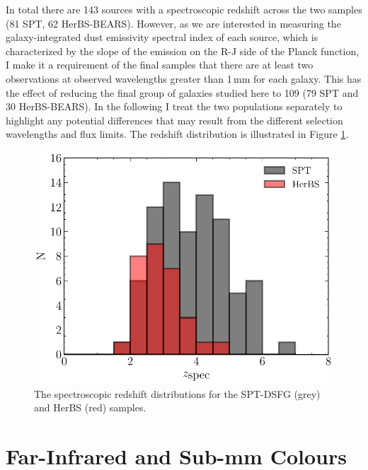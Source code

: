 In total there are 143 sources with a spectroscopic redshift across the two samples (81 SPT, 62 HerBS-BEARS). However, as we are interested in measuring the galaxy-integrated dust emissivity spectral index of each source, which is characterized by the slope of the emission on the R-J side of the Planck function, I make it a requirement of the final samples that there are at least two observations at observed wavelengths greater than 1\,mm for each galaxy. This has the effect of reducing the final group of galaxies studied here to 109 (79 SPT and 30 HerBS-BEARS). In the following I treat the two populations separately to highlight any potential differences that may result from the different selection wavelengths and flux limits. The redshift distribution is illustrated in Figure \ref{fig:spt_herbs_redshift}.

\begin{figure}
	\includegraphics[width=\columnwidth]{Figures/spt_herbs_redshift_distribution.pdf}
	\caption{The spectroscopic redshift distributions for the SPT-DSFG (grey) and HerBS (red) samples.}
	\label{fig:spt_herbs_redshift}
\end{figure}

\section{Far-Infrared and Sub-mm Colours}
\label{sec:fir_submm_colours}

